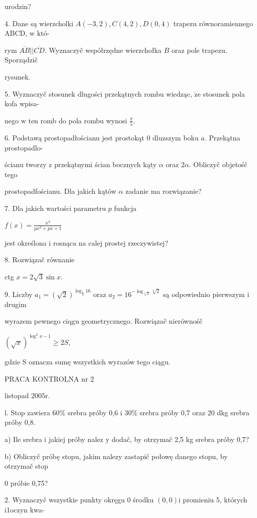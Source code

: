 \documentclass[a4paper,12pt]{article}
\begin{document}
urodzin?

4. Dane są wierzcholki $A(-3,2), C(4,2), D(0,4)$ trapezu równoramiennego ABCD, $\mathrm{w}$ któ-

rym $\overline{AB}||\overline{CD}$. Wyznaczyč współrzędne wierzchołka $B$ oraz pole trapezu. Sporządzič

rysunek.

5. Wyznaczyč stosunek dlugości przekątnych rombu wiedząc, $\dot{\mathrm{z}}\mathrm{e}$ stosunek pola kofa wpisa-

nego $\mathrm{w}$ ten romb do pola rombu wynosi $\displaystyle \frac{\pi}{5}.$

6. Podstawą prostopadłościanu jest prostokąt $0$ dluzszym boku $a$. Przekątna prostopadlo-

ścianu tworzy $\mathrm{z}$ przekątnymi ścian bocznych kąty $\alpha$ oraz $ 2\alpha$. Obliczyč objetośč tego

prostopadfościanu. Dla jakich kątów $\alpha$ zadanie ma rozwiązanie?

7. Dla jakich wartości parametru $p$ funkcja

$f(x)=\displaystyle \frac{x^{3}}{px^{2}+px+1}$

jest określona $\mathrm{i}$ rosnąca na calej prostej rzeczywistej?

8. Rozwiązač równanie

ctg $x=2\sqrt{3}\sin x.$

9. Liczby $a_{1} = (\sqrt{2})^{\log_{\frac{1}{2}}16}$ oraz $a_{2} = 16^{-\log_{\sqrt[3]{2}}\sqrt[4]{2}}$ są odpowiednio pierwszym $\mathrm{i}$ drugim

wyrazem pewnego ciqgu geometrycznego. Rozwiązač nierównośč

$(\sqrt{x})^{\log^{2}x-1}\geq 2S,$

gdzie S oznacza sumę wszystkich wyrazów tego ciągu.




PRACA KONTROLNA nr 2

listopad $2005\mathrm{r}.$

l. Stop zawiera 60\% srebra próby 0,6 $\mathrm{i}$ 30\% srebra próby 0,7 oraz 20 dkg srebra próby 0,8.

a) Ile srebra $\mathrm{i}$ jakiej próby nalez $\mathrm{y}$ dodač, by otrzymač 2,5 kg srebra próby 0,7?

b) Obliczyč próbę stopu, jakim nalezy zastapič połowę danego stopu, by otrzymač stop

$0$ próbie 0,75?

2. Wyznaczyč wszystkie punkty okręgu $0$ środku $(0,0)\mathrm{i}$ promieniu 5, których i1oczyn kwa-
\end{document}
